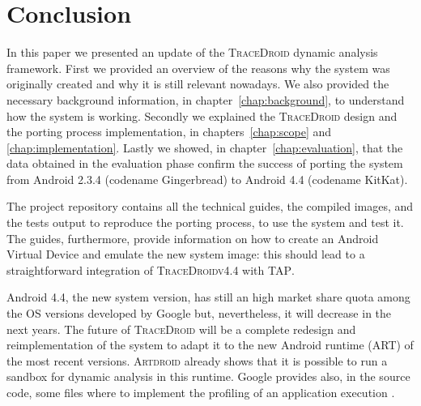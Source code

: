 \chapter{Conclusion}
\label{chap:conclusions}

In this paper we presented an update of the \textsc{TraceDroid} dynamic
analysis framework. First we provided an overview of the reasons why
the system was originally created and why it is still relevant
nowadays. We also provided the necessary background information, in chapter~\ref{chap:background}, to
understand how the system is working. Secondly we explained the
\textsc{TraceDroid} design and the porting process implementation, in chapters~\ref{chap:scope} and \ref{chap:implementation}. Lastly we
showed, in chapter~\ref{chap:evaluation}, that the data obtained in the evaluation phase confirm the
success of porting the system from Android 2.3.4 (codename
Gingerbread) to Android 4.4 (codename KitKat).

The project repository \cite{ref15} contains all the technical guides, the
compiled images, and the tests output to reproduce the porting
process, to use the system and test it. The guides, furthermore,
provide information on how to create an Android Virtual Device and
emulate the new system image: this should lead to a straightforward
integration of \textsc{TraceDroidv4.4} with \textsc{TAP}.

Android 4.4, the new system version, has still an high market share
quota among the OS versions developed by Google but, nevertheless, it
will decrease in the next years. The future of \textsc{TraceDroid} will be a
complete redesign and reimplementation of the system to adapt it to
the new Android runtime (ART) of the most recent versions. \textsc{Artdroid}
\cite{ref28} already shows that it is possible to run a sandbox for dynamic
analysis in this runtime. Google provides also, in the source code,
some files where to implement the profiling of an application
execution \cite{ref29}.
